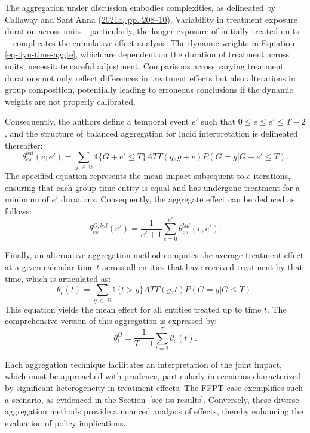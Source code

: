 \documentclass[12pt, a4paper, twoside]{article}
\numberwithin{equation}{subsection} %
\begin{document}
The aggregation under discussion embodies complexities, as delineated by
Callaway and Sant'Anna (\protect\hyperlink{ref-CALLAWAY2021200}{2021a,
pp. 208--10}). Variability in treatment exposure duration across
units---particularly, the longer exposure of initially treated
units---complicates the cumulative effect analysis. The dynamic weights
in Equation \eqref{eq-dyn-time-aggte}, which are dependent on the
duration of treatment across units, necessitate careful adjustment.
Comparisons across varying treatment durations not only reflect
differences in treatment effects but also alterations in group
composition, potentially leading to erroneous conclusions if the dynamic
weights are not properly calibrated.

Consequently, the authors define a temporal event
\(e' \text{ such that } 0 \leq e \leq e' \leq T - 2\), and the structure
of balanced aggregation for lucid interpretation is delineated
thereafter: \begin{equation} \label{eq-bal-dyn-time-aggte}
\theta_{es}^{bal}(e; e') = \sum_{g \; \in \; \mathbb{G}} \mathds{1}\{G + e' \leq T\}  ATT(g, g + e) P(G = g|G + e' \leq T).
\end{equation} The specified equation represents the mean impact
subsequent to \(e\) iterations, ensuring that each group-time entity is
equal and has undergone treatment for a minimum of \(e'\) durations.
Consequently, the aggregate effect can be deduced as follows:
\begin{equation} \label{eq-dyn-bal-overall}
\theta_{es}^{O, bal}(e') = \frac{1}{e' + 1} \sum_{e = 0}^{e'} \theta_{es}^{bal}(e, e').
\end{equation}

Finally, an alternative aggregation method computes the average
treatment effect at a given calendar time \(t\) across all entities that
have received treatment by that time, which is articulated as:
\begin{equation} \label{eq-cal-time-aggte}
\theta_{c}(t) = \sum_{g \; \in \; \mathbb{G}} \mathds{1}\{t > g\}  ATT(g, t) P(G = g| G \leq T).
\end{equation} This equation yields the mean effect for all entities
treated up to time \(t\). The comprehensive version of this aggregation
is expressed by: \begin{equation} \label{eq-dyn-overall}
\theta_{t}^O = \frac{1}{T-1} \sum_{t = 2}^{T} \theta_{c}(t).
\end{equation}

Each aggregation technique facilitates an interpretation of the joint
impact, which must be approached with prudence, particularly in
scenarios characterized by significant heterogeneity in treatment
effects. The FFPT case exemplifies such a scenario, as evidenced in the
Section~\ref{sec-iss-results}. Conversely, these diverse aggregation
methods provide a nuanced analysis of effects, thereby enhancing the
evaluation of policy implications.
\end{document}
